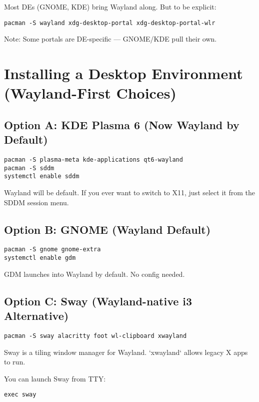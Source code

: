 \documentclass[12pt]{book}
\begin{document}
Most DEs (GNOME, KDE) bring Wayland along. But to be explicit:

\begin{lstlisting}
pacman -S wayland xdg-desktop-portal xdg-desktop-portal-wlr
\end{lstlisting}

Note: Some portals are DE-specific — GNOME/KDE pull their own.

\section{Installing a Desktop Environment (Wayland-First Choices)}

\subsection*{Option A: KDE Plasma 6 (Now Wayland by Default)}

\begin{lstlisting}
pacman -S plasma-meta kde-applications qt6-wayland
pacman -S sddm
systemctl enable sddm
\end{lstlisting}

Wayland will be default. If you ever want to switch to X11, just select it from the SDDM session menu.

\subsection*{Option B: GNOME (Wayland Default)}

\begin{lstlisting}
pacman -S gnome gnome-extra
systemctl enable gdm
\end{lstlisting}

GDM launches into Wayland by default. No config needed.

\subsection*{Option C: Sway (Wayland-native i3 Alternative)}

\begin{lstlisting}
pacman -S sway alacritty foot wl-clipboard xwayland
\end{lstlisting}

Sway is a tiling window manager for Wayland. `xwayland` allows legacy X apps to run.

You can launch Sway from TTY:

\begin{lstlisting}
exec sway
\end{lstlisting}
\end{document}
